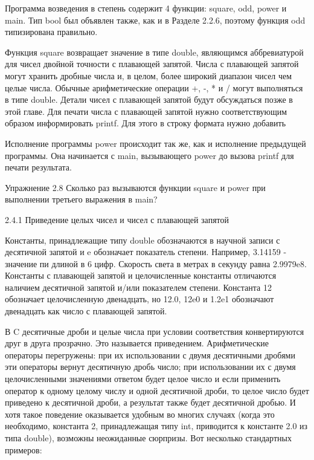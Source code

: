 Программа возведения в степень содержит 4 функции: square, odd, power и main. Тип bool был объявлен также, как и в Разделе 2.2.6, поэтому функция odd типизирована правильно.

Функция square возвращает значение в типе double, являющимся аббревиатурой для чисел двойной точности с плавающей запятой. Числа с плавающей запятой могут хранить дробные числа и, в целом, более широкий диапазон чисел чем целые числа. Обычные арифметические операции +, -, * и / могут выполняться в типе double. Детали чисел с плавающей запятой будут обсуждаться позже в этой главе. Для печати числа с плавающей запятой нужно соответствующим образом информировать printf. Для этого в строку формата нужно добавить %

Исполнение программы power происходит так же, как и исполнение предыдущей программы. Она начинается с main, вызывающего power до вызова printf для печати результата.

Упражнение 2.8 Сколько раз вызываются функции square и power при выполнении третьего выражения в main?

2.4.1 Приведение целых чисел и чисел с плавающей запятой

Константы, принадлежащие типу double обозначаются в научной записи с десятичной запятой и e обозначает показатель степени. Например, 3.14159 - значение пи длиной в 6 цифр. Скорость света в метрах в секунду равна 2.9979e8. Константы с плавающей запятой и целочисленные константы отличаются наличием десятичной запятой и/или показателем степени. Константа 12 обозначает целочисленную двенадцать, но 12.0, 12e0 и 1.2e1 обозначают двенадцать как число с плавающей запятой.

В C десятичные дроби и целые числа при условии соответствия конвертируются друг в друга прозрачно. Это называется приведением. Арифметические операторы перегружены: при их использовании с двумя десятичными дробями эти операторы вернут десятичную дробь число; при использовании их с двумя целочисленными значениями ответом будет целое число и если применить оператор к одному целому числу и одной десятичной дроби, то целое число будет приведено к десятичной дроби, а результат также будет десятичной дробью. И хотя такое поведение оказывается удобным во многих случаях (когда это необходимо, константа 2, принадлежащая типу int, приводится к константе 2.0 из типа double), возможны неожиданные сюрпризы. Вот несколько стандартных примеров:

